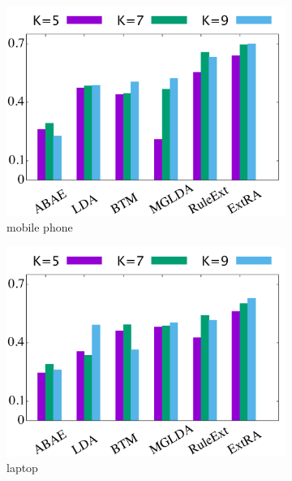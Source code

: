 \begin{figure}[!ht]
	\begin{subfigure}{.333\textwidth}
		\centering
		\includegraphics[width=\linewidth]{figures/mobilephone_s}
		\caption{mobile phone}
		\label{fig:mobilephone_s}
	\end{subfigure}%
	\begin{subfigure}{.333\textwidth}
		\centering
		\includegraphics[width=\linewidth]{figures/laptop_s}
		\caption{laptop}
		\label{fig:laptop_s}
	\end{subfigure}%
	\begin{subfigure}{.333\textwidth}
		\centering

\end{subfigure}
\end{figure}
